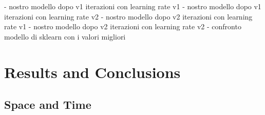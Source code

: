 \documentclass[
	letterpaper, %
	10pt, %
]{class}
\begin{document}
- nostro modello dopo v1 iterazioni con learning rate v1
- nostro modello dopo v1 iterazioni con learning rate v2
- nostro modello dopo v2 iterazioni con learning rate v1
- nostro modello dopo v2 iterazioni con learning rate v2
- confronto modello di sklearn con i valori migliori



\section{Results and Conclusions}

\subsection{Space and Time}



\printbibliography %

\end{document}
